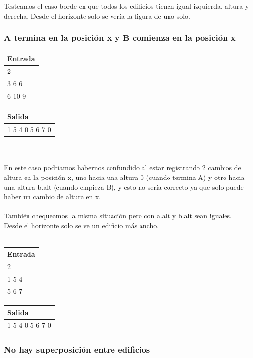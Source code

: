 \\
\\
Testeamos el caso borde en que todos los edificios tienen igual izquierda, altura y derecha. Desde el horizonte solo se ver\'ia la figura de uno solo.


\subsubsection{A termina en la posici\'on x y B comienza en la posici\'on x}
\quad \quad \quad  \begin{tabular}{| l |}
\hline
Entrada \\ \hline
2 \\ 
3 6 6 \\ 
6 10 9 \\ \hline
\end{tabular}
\quad \quad \quad 
\begin{tabular}{| l |}
\hline
Salida \\ \hline
1 5 4 0 5 6 7 0 \\ \hline
\end{tabular}

\\
\\
En este caso podriamos habernos confundido al estar registrando 2 cambios de altura en la posici\'on x, uno hacia una altura 0 (cuando termina A) y otro hacia una altura b.alt (cuando empieza B), y esto no ser\'ia correcto ya que solo puede haber un cambio de altura en x.\\ \\
Tambi\'en chequeamos la misma situaci\'on pero con a.alt y b.alt sean iguales. Desde el horizonte solo se ve un edificio m\'as ancho.
\\
\\
\quad \quad \quad  \begin{tabular}{| l |}
\hline
Entrada \\ \hline
2 \\
1 5 4 \\ 
5 6 7 \\ \hline
\end{tabular}
\quad \quad \quad 
\begin{tabular}{| l |}
\hline
Salida \\ \hline
1 5 4 0 5 6 7 0   \\ \hline
\end{tabular}



\subsubsection{No hay superposici\'on entre edificios}


